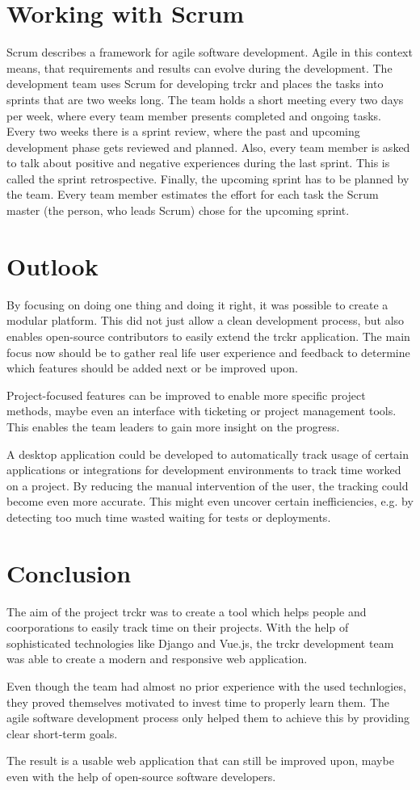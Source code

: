 \documentclass[bibliography=totoc, listof=totocnumbered]{scrartcl}
\begin{document}
\section{Working with Scrum}
Scrum describes a framework for agile software development. Agile in this
context means, that requirements and results can evolve during the development.
The development team uses Scrum for developing trckr and places the tasks into
sprints that are two weeks long. The team holds a short meeting every two days
per week, where every team member presents completed and ongoing tasks. Every
two weeks there is a sprint review, where the past and upcoming development
phase gets reviewed and planned. Also, every team member is asked to talk about
positive and negative experiences during the last sprint. This is called the
sprint retrospective. Finally, the upcoming sprint has to be planned by the
team. Every team member estimates the effort for each task the Scrum master (the
person, who leads Scrum) chose for the upcoming sprint.

\section{Outlook}
By focusing on doing one thing and doing it right, it was possible to create a
modular platform. This did not just allow a clean development process, but also
enables open-source contributors to easily extend the trckr application. The
main focus now should be to gather real life user experience and feedback to
determine which features should be added next or be improved upon.

Project-focused features can be improved to enable more specific project
methods, maybe even an interface with ticketing or project management tools.
This enables the team leaders to gain more insight on the progress.

A desktop application could be developed to automatically track usage of certain
applications or integrations for development environments to track time worked
on a project. By reducing the manual intervention of the user, the tracking
could become even more accurate. This might even uncover certain inefficiencies,
e.g. by detecting too much time wasted waiting for tests or deployments.

\section{Conclusion}
The aim of the project trckr was to create a tool which helps people and
coorporations to easily track time on their projects. With the help of
sophisticated technologies like Django and Vue.js, the trckr development
team was able to create a modern and responsive web application.

Even though the team had almost no prior experience with the used technlogies,
they proved themselves motivated to invest time to properly learn them. The
agile software development process only helped them to achieve this by providing
clear short-term goals.

The result is a usable web application that can still be improved upon, maybe
even with the help of open-source software developers.

\clearpage
\printbibliography
\end{document}
